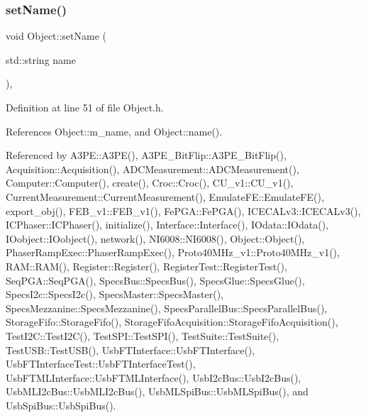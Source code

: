 \subsubsection{\texorpdfstring{set\+Name()}{setName()}}
{\footnotesize\ttfamily void Object\+::set\+Name (\begin{DoxyParamCaption}\item[{std\+::string}]{name }\end{DoxyParamCaption})\hspace{0.3cm}{\ttfamily [inline]}, {\ttfamily [inherited]}}



Definition at line 51 of file Object.\+h.



References Object\+::m\+\_\+name, and Object\+::name().



Referenced by A3\+P\+E\+::\+A3\+P\+E(), A3\+P\+E\+\_\+\+Bit\+Flip\+::\+A3\+P\+E\+\_\+\+Bit\+Flip(), Acquisition\+::\+Acquisition(), A\+D\+C\+Measurement\+::\+A\+D\+C\+Measurement(), Computer\+::\+Computer(), create(), Croc\+::\+Croc(), C\+U\+\_\+v1\+::\+C\+U\+\_\+v1(), Current\+Measurement\+::\+Current\+Measurement(), Emulate\+F\+E\+::\+Emulate\+F\+E(), export\+\_\+obj(), F\+E\+B\+\_\+v1\+::\+F\+E\+B\+\_\+v1(), Fe\+P\+G\+A\+::\+Fe\+P\+G\+A(), I\+C\+E\+C\+A\+Lv3\+::\+I\+C\+E\+C\+A\+Lv3(), I\+C\+Phaser\+::\+I\+C\+Phaser(), initialize(), Interface\+::\+Interface(), I\+Odata\+::\+I\+Odata(), I\+Oobject\+::\+I\+Oobject(), network(), N\+I6008\+::\+N\+I6008(), Object\+::\+Object(), Phaser\+Ramp\+Exec\+::\+Phaser\+Ramp\+Exec(), Proto40\+M\+Hz\+\_\+v1\+::\+Proto40\+M\+Hz\+\_\+v1(), R\+A\+M\+::\+R\+A\+M(), Register\+::\+Register(), Register\+Test\+::\+Register\+Test(), Seq\+P\+G\+A\+::\+Seq\+P\+G\+A(), Specs\+Bus\+::\+Specs\+Bus(), Specs\+Glue\+::\+Specs\+Glue(), Specs\+I2c\+::\+Specs\+I2c(), Specs\+Master\+::\+Specs\+Master(), Specs\+Mezzanine\+::\+Specs\+Mezzanine(), Specs\+Parallel\+Bus\+::\+Specs\+Parallel\+Bus(), Storage\+Fifo\+::\+Storage\+Fifo(), Storage\+Fifo\+Acquisition\+::\+Storage\+Fifo\+Acquisition(), Test\+I2\+C\+::\+Test\+I2\+C(), Test\+S\+P\+I\+::\+Test\+S\+P\+I(), Test\+Suite\+::\+Test\+Suite(), Test\+U\+S\+B\+::\+Test\+U\+S\+B(), Usb\+F\+T\+Interface\+::\+Usb\+F\+T\+Interface(), Usb\+F\+T\+Interface\+Test\+::\+Usb\+F\+T\+Interface\+Test(), Usb\+F\+T\+M\+L\+Interface\+::\+Usb\+F\+T\+M\+L\+Interface(), Usb\+I2c\+Bus\+::\+Usb\+I2c\+Bus(), Usb\+M\+L\+I2c\+Bus\+::\+Usb\+M\+L\+I2c\+Bus(), Usb\+M\+L\+Spi\+Bus\+::\+Usb\+M\+L\+Spi\+Bus(), and Usb\+Spi\+Bus\+::\+Usb\+Spi\+Bus().



